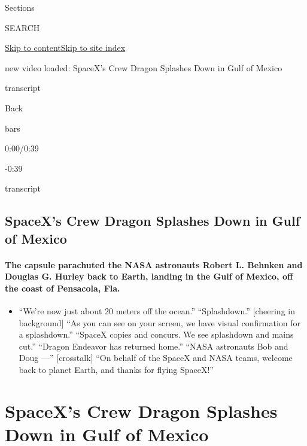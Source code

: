 Sections

SEARCH

\protect\hyperlink{site-content}{Skip to
content}\protect\hyperlink{site-index}{Skip to site index}

new video loaded: SpaceX's Crew Dragon Splashes Down in Gulf of Mexico

transcript

Back

bars

0:00/0:39

-0:39

transcript

\hypertarget{spacexs-crew-dragon-splashes-down-in-gulf-of-mexico}{%
\subsection{SpaceX's Crew Dragon Splashes Down in Gulf of
Mexico}\label{spacexs-crew-dragon-splashes-down-in-gulf-of-mexico}}

\hypertarget{the-capsule-parachuted-the-nasa-astronauts-robert-l-behnken-and-douglas-g-hurley-back-to-earth-landing-in-the-gulf-of-mexico-off-the-coast-of-pensacola-fla}{%
\paragraph{The capsule parachuted the NASA astronauts Robert L. Behnken
and Douglas G. Hurley back to Earth, landing in the Gulf of Mexico, off
the coast of Pensacola,
Fla.}\label{the-capsule-parachuted-the-nasa-astronauts-robert-l-behnken-and-douglas-g-hurley-back-to-earth-landing-in-the-gulf-of-mexico-off-the-coast-of-pensacola-fla}}

\begin{itemize}
\tightlist
\item
  ``We're now just about 20 meters off the ocean.'' ``Splashdown.''
  {[}cheering in background{]} ``As you can see on your screen, we have
  visual confirmation for a splashdown.'' ``SpaceX copies and concurs.
  We see splashdown and mains cut.'' ``Dragon Endeavor has returned
  home.'' ``NASA astronauts Bob and Doug ---'' {[}crosstalk{]} ``On
  behalf of the SpaceX and NASA teams, welcome back to planet Earth, and
  thanks for flying SpaceX!''
\end{itemize}

\hypertarget{spacexs-crew-dragon-splashes-down-in-gulf-of-mexico-1}{%
\section{SpaceX's Crew Dragon Splashes Down in Gulf of
Mexico}\label{spacexs-crew-dragon-splashes-down-in-gulf-of-mexico-1}}

